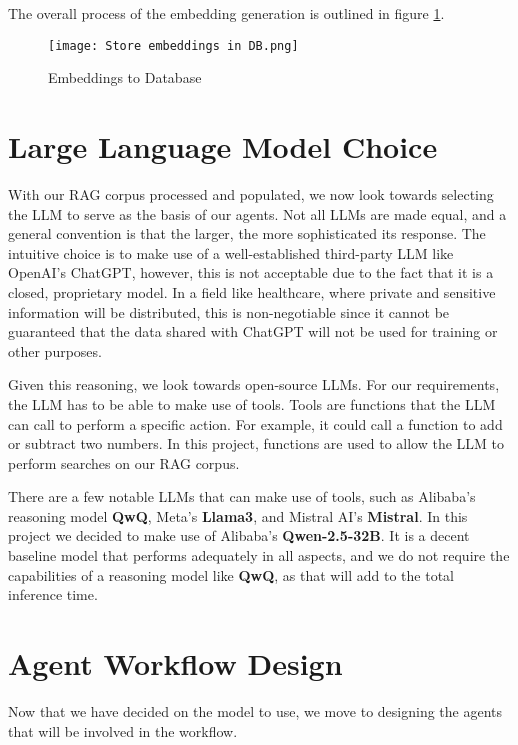 The overall process of the embedding generation is outlined in figure \ref{fig:EmbeddingsDatabase}.

\begin{figure}
	\texttt{[image: Store embeddings in DB.png]}
	\caption{Embeddings to Database}
	\centering
	\label{fig:EmbeddingsDatabase}
\end{figure}


\section{Large Language Model Choice}

With our RAG corpus processed and populated, we now look towards selecting the LLM to serve as the basis of our agents.
Not all LLMs are made equal, and a general convention is that the larger, the more sophisticated its response.
The intuitive choice is to make use of a well-established third-party LLM like OpenAI's ChatGPT, however, this is not acceptable due to the fact that it is a closed, proprietary model. In a field like healthcare, where private and sensitive information will be distributed, this is non-negotiable since it cannot be guaranteed that the data shared with ChatGPT will not be used for training or other purposes.

Given this reasoning, we look towards open-source LLMs. For our requirements, the LLM has to be able to make use of tools. Tools are functions that the LLM can call to perform a specific action. For example, it could call a function to add or subtract two numbers. In this project, functions are used to allow the LLM to perform searches on our RAG corpus.

There are a few notable LLMs that can make use of tools, such as Alibaba's reasoning model \textbf{QwQ}, Meta's \textbf{Llama3}, and Mistral AI's \textbf{Mistral}. In this project we decided to make use of Alibaba's \textbf{Qwen-2.5-32B}. It is a decent baseline model that performs adequately in all aspects, and we do not require the capabilities of a reasoning model like \textbf{QwQ}, as that will add to the total inference time.

\section{Agent Workflow Design}

Now that we have decided on the model to use, we move to designing the agents that will be involved in the workflow.

